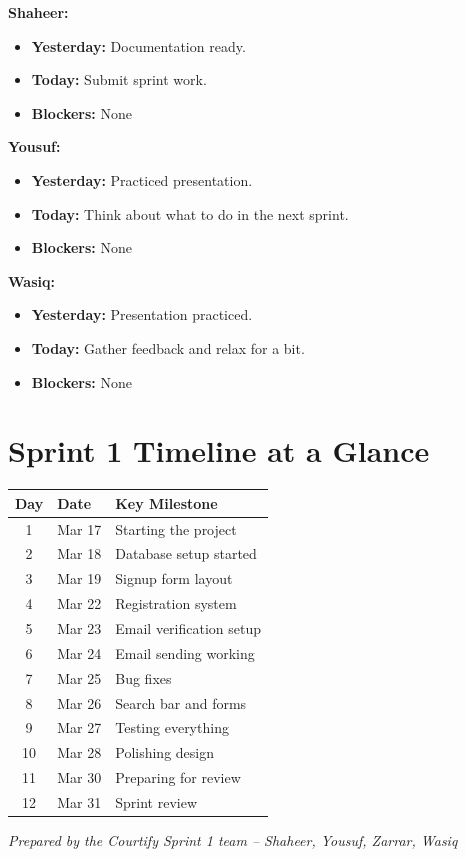\documentclass[12pt,a4paper]{article}
\begin{document}
\textbf{Shaheer:}
\begin{itemize}[noitemsep]
    \item \textbf{Yesterday:} Documentation ready.
    \item \textbf{Today:} Submit sprint work.
    \item \textbf{Blockers:} None
\end{itemize}

\textbf{Yousuf:}
\begin{itemize}[noitemsep]
    \item \textbf{Yesterday:} Practiced presentation.
    \item \textbf{Today:} Think about what to do in the next sprint.
    \item \textbf{Blockers:} None
\end{itemize}

\textbf{Wasiq:}
\begin{itemize}[noitemsep]
    \item \textbf{Yesterday:} Presentation practiced.
    \item \textbf{Today:} Gather feedback and relax for a bit.
    \item \textbf{Blockers:} None
\end{itemize}

\newpage

\section{Sprint 1 Timeline at a Glance}

\renewcommand{\arraystretch}{1.4}
\begin{tabularx}{\textwidth}{|c|l|X|}
\hline
\rowcolor{headerbg}\color{white}\bfseries Day & \color{white}\bfseries Date & \color{white}\bfseries Key Milestone \\ \hline
1 & Mar 17 & Starting the project \\ \hline
\rowcolor{rowgray} 2 & Mar 18 & Database setup started \\ \hline
3 & Mar 19 & Signup form layout \\ \hline
\rowcolor{rowgray} 4 & Mar 22 & Registration system \\ \hline
5 & Mar 23 & Email verification setup \\ \hline
\rowcolor{rowgray} 6 & Mar 24 & Email sending working \\ \hline
7 & Mar 25 & Bug fixes \\ \hline
\rowcolor{rowgray} 8 & Mar 26 & Search bar and forms \\ \hline
9 & Mar 27 & Testing everything \\ \hline
\rowcolor{rowgray} 10 & Mar 28 & Polishing design \\ \hline
11 & Mar 30 & Preparing for review \\ \hline
\rowcolor{rowgray} 12 & Mar 31 & Sprint review \\ \hline
\end{tabularx}

\vspace{2cm}
\begin{center}
\textit{Prepared by the Courtify Sprint 1 team -- Shaheer, Yousuf, Zarrar, Wasiq}
\end{center}
\end{document}
